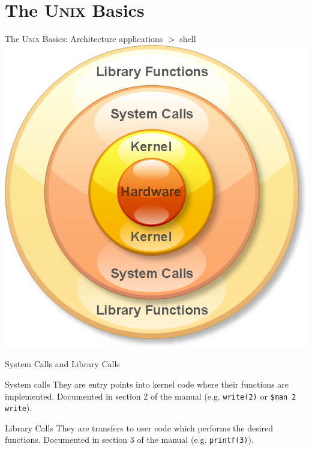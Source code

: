 \documentclass[newPxFont,sthlmFooter,nooffset]{beamer}
\begin{document}
\section{The \textsc{Unix} Basics}

\begin{frame}[t]{The \textsc{Unix} Basics: Architecture}
applications $>$ shell
\bigskip
~
\centering
\includegraphics[height=0.85\textheight]{./figure/System-Call-and-Library-Function.png}
\end{frame}



\begin{frame}[t]{System Calls and Library Calls}
\begin{block}{System calls} 
They are entry points into kernel code where their functions are implemented.  Documented in section 2 of the manual (e.g. \texttt{write(2)} or \texttt{\$man 2 write}).
\end{block}
\bigskip

\begin{block}{Library Calls}
They are transfers to user code which performs the desired functions. Documented in section 3 of the manual (e.g. \texttt{printf(3)}).
\end{block}
\end{frame}
\end{document}
